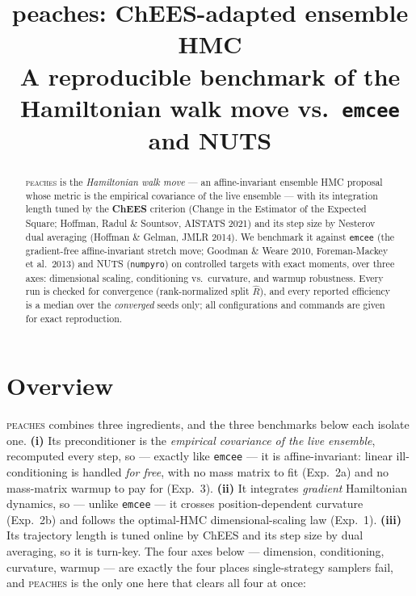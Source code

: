 \documentclass[11pt]{article}
\title{\textbf{peaches}: ChEES-adapted ensemble HMC\\[2pt]
\large A reproducible benchmark of the Hamiltonian walk move vs.\ \texttt{emcee}
and NUTS}
\author{}
\date{}
\begin{document}
\maketitle

\begin{abstract}
\noindent
\textsc{peaches} is the \emph{Hamiltonian walk move} --- an affine-invariant
ensemble HMC proposal whose metric is the empirical covariance of the live
ensemble --- with its integration length tuned by the \textbf{ChEES} criterion
(Change in the Estimator of the Expected Square; Hoffman, Radul \& Sountsov,
AISTATS 2021) and its step size by Nesterov dual averaging (Hoffman \& Gelman,
JMLR 2014). We benchmark it against \texttt{emcee} (the gradient-free
affine-invariant stretch move; Goodman \& Weare 2010, Foreman-Mackey et al.\
2013) and NUTS (\texttt{numpyro}) on controlled targets with exact moments, over
three axes: dimensional scaling, conditioning vs.\ curvature, and warmup
robustness. Every run is checked for convergence (rank-normalized split
$\hat R$), and every reported efficiency is a median over the \emph{converged}
seeds only; all configurations and commands are given for exact reproduction.
\end{abstract}

\section*{Overview}

\textsc{peaches} combines three ingredients, and the three benchmarks below each
isolate one. \textbf{(i)} Its preconditioner is the \emph{empirical covariance of
the live ensemble}, recomputed every step, so --- exactly like \texttt{emcee} ---
it is affine-invariant: linear ill-conditioning is handled \emph{for free}, with
no mass matrix to fit (Exp.~2a) and no mass-matrix warmup to pay for (Exp.~3).
\textbf{(ii)} It integrates \emph{gradient} Hamiltonian dynamics, so --- unlike
\texttt{emcee} --- it crosses position-dependent curvature (Exp.~2b) and follows
the optimal-HMC dimensional-scaling law (Exp.~1). \textbf{(iii)} Its trajectory
length is tuned online by ChEES and its step size by dual averaging, so it is
turn-key. The four axes below --- dimension, conditioning, curvature, warmup ---
are exactly the four places single-strategy samplers fail, and \textsc{peaches}
is the only one here that clears all four at once:
\end{document}
